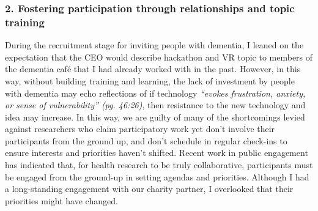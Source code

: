 

\subsubsection{2. Fostering participation through relationships and topic training}
\label{TopicTraining}
During the recruitment stage for inviting people with dementia, I leaned on the expectation that the CEO would describe hackathon and VR topic to members of the dementia café that I had already worked with in the past. However, in this way, without building training and learning, the lack of investment by people with dementia may echo \cite{hwang2020exploring} reflections of if technology \textit{“evokes frustration, anxiety, or sense of vulnerability” (pg. 46:26)}, then resistance to the new technology and idea may increase. In this way, we are guilty of many of the shortcomings levied against researchers who claim participatory work yet don’t involve their participants from the ground up, and don’t schedule in regular check-ins to ensure interests and priorities haven’t shifted. Recent work in public engagement has indicated that, for health research to be truly collaborative, participants must be engaged from the ground-up in setting agendas and priorities. Although I had a long-standing engagement with our charity partner, I overlooked that their priorities might have changed.

